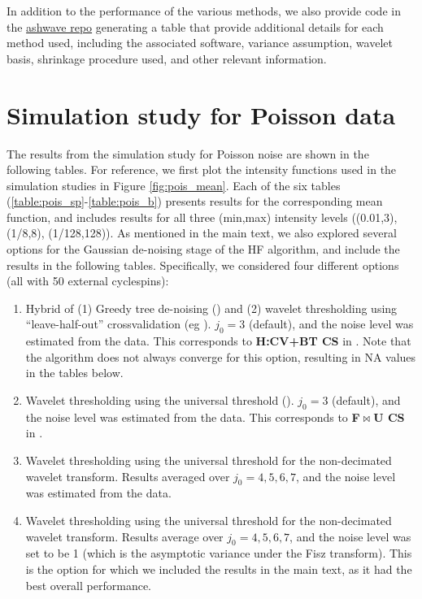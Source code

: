 \documentclass[12pt]{article}
\begin{document}
In addition to the performance of the various methods, we also provide code in the \href{https://github.com/stephenslab/ashwave}{ashwave repo} generating a table that provide additional details for each method used, including the associated software, variance assumption, wavelet basis, shrinkage procedure used, and other relevant information.


\section{Simulation study for Poisson data}
The results from the simulation study for Poisson noise are shown in the following tables. For reference, we first plot the intensity functions used in the simulation studies in Figure \ref{fig:pois_mean}. Each of the six tables (\ref{table:pois_sp}-\ref{table:pois_b}) presents results for the corresponding mean function, and includes results for all three (min,max) intensity levels ((0.01,3), (1/8,8), (1/128,128)). As mentioned in the main text, we also explored several options for the Gaussian de-noising stage of the HF algorithm, and include the results in the following tables. Specifically, we considered four different options (all with 50 external cyclespins):
\begin{enumerate}
\item Hybrid of (1) Greedy tree de-noising (\cite{Baraniuk1999Optimal}) and (2) wavelet thresholding using ``leave-half-out'' crossvalidation (eg \cite{Nason1995Choice}). $j_0=3$ (default), and the noise level was estimated from the data. This corresponds to \textbf{H:CV+BT CS} in \cite{Fryzlewicz2004HaarFisz}. Note that the algorithm does not always converge for this option, resulting in NA values in the tables below.
\item Wavelet thresholding using the universal threshold (\cite{Donoho1994Ideal}). $j_0=3$ (default), and the noise level was estimated from the data. This corresponds to \textbf{F$\bowtie$U CS} in \cite{Fryzlewicz2004HaarFisz}.
\item Wavelet thresholding using the universal threshold for the non-decimated wavelet transform. Results averaged over $j_0=4,5,6,7$, and the noise level was estimated from the data.
\item Wavelet thresholding using the universal threshold for the non-decimated wavelet transform. Results average over $j_0=4,5,6,7$, and the noise level was set to be 1 (which is the asymptotic variance under the Fisz transform). This is the option for which we included the results in the main text, as it had the best overall performance.
\end{enumerate}
\end{document}
